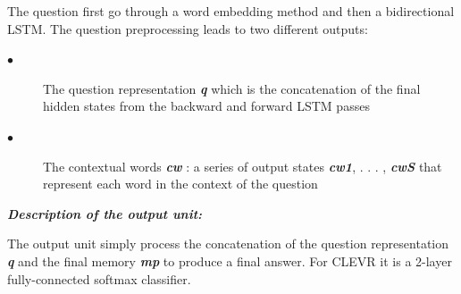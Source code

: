The question first go through a word embedding method and then a bidirectional LSTM.
The question preprocessing leads to two different outputs:

\begin{description}
	\item[$\bullet$] The question representation \textbf{\textit{q}} which is the concatenation of the final hidden states from the backward and forward LSTM passes
	\item[$\bullet$] The contextual words \textbf{\textit{cw}} : a series of output states \textbf{\textit{cw1}}, . . . , \textbf{\textit{cwS}} that represent each word in the context of the question
\end{description}



\textbf{\textit{Description of the output unit:}}

The output unit simply process the concatenation of the question representation  \textbf{\textit{q}} and the final memory  \textbf{\textit{mp}} to produce a final answer. For CLEVR it is a 2-layer fully-connected softmax classifier.




